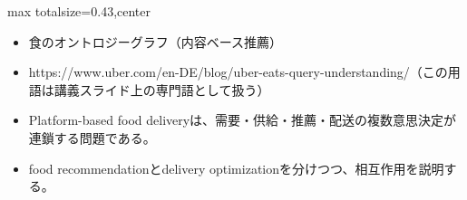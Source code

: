 \clearpage
{}
\begin{minipage}[t]{0.405\textwidth}
\begin{adjustbox}{max totalsize={\textwidth}{0.43\textheight},center}
\begin{minipage}{\textwidth}\scriptsize
{}\begin{itemize}
\item 食のオントロジーグラフ（内容ベース推薦）
\item https://www.uber.com/en-DE/blog/uber-eats-query-understanding/（この用語は講義スライド上の専門語として扱う）
\end{itemize}\begin{itemize}
\item Platform-based food deliveryは、需要・供給・推薦・配送の複数意思決定が連鎖する問題である。
\item food recommendationとdelivery optimizationを分けつつ、相互作用を説明する。
\end{itemize}
\end{minipage}
\end{adjustbox}
\end{minipage}\hfill
